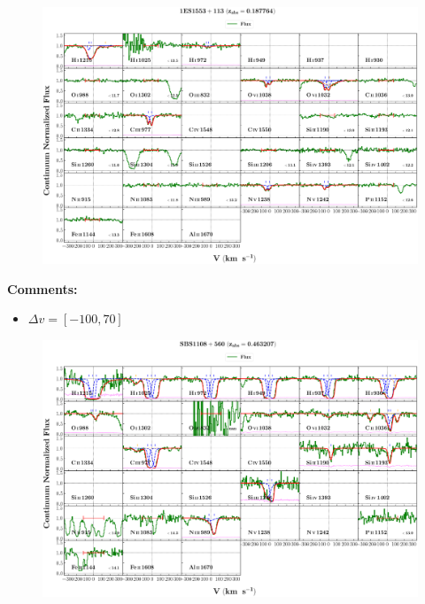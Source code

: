 \documentclass[12pt]{report}
\begin{document}
\begin{landscape}

    \begin{figure}
        \centering
        \vspace{-20mm}
        \hspace*{-35mm}
        \includegraphics[width=1.25\linewidth]{sys_plots_full/1ES1553+113_z=0.187764_sys_plot_full.png}
    \end{figure}
    
\end{landscape}


\textbf{Comments:}

\begin{itemize}
    \item $\Delta v = [-100,70]$
\end{itemize}


\begin{landscape}

    \begin{figure}
        \centering
        \vspace{-20mm}
        \hspace*{-35mm}
        \includegraphics[width=1.25\linewidth]{sys_plots_full/SBS1108+560_z=0.463207_sys_plot_full.png}
    \end{figure}
    
\end{landscape}
\end{document}
